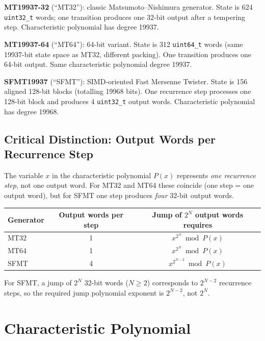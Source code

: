 \documentclass{article}
\begin{document}
\noindent\textbf{MT19937-32} (``MT32''): classic Matsumoto--Nishimura generator.  State is
624 \texttt{uint32\_t} words; one transition produces one 32-bit output after a tempering
step.  Characteristic polynomial has degree 19937.

\noindent\textbf{MT19937-64} (``MT64''): 64-bit variant.  State is 312 \texttt{uint64\_t}
words (same 19937-bit state space as MT32, different packing).  One transition produces
one 64-bit output.  Same characteristic polynomial degree 19937.

\noindent\textbf{SFMT19937} (``SFMT''): SIMD-oriented Fast Mersenne Twister.  State is 156
aligned 128-bit blocks (totalling 19968 bits).  One recurrence step processes one 128-bit
block and produces 4 \texttt{uint32\_t} output words.  Characteristic polynomial has degree
19968.

\subsection{Critical Distinction: Output Words per Recurrence Step}
\label{sec:output_per_step}

The variable $x$ in the characteristic polynomial $P(x)$ represents \emph{one recurrence
step}, not one output word.  For MT32 and MT64 these coincide (one step = one output word),
but for SFMT one step produces \emph{four} 32-bit output words.

\begin{center}
\begin{tabular}{lcc}
\toprule
Generator & Output words per step & Jump of $2^N$ output words requires \\
\midrule
MT32  & 1 & $x^{2^N} \bmod P(x)$ \\
MT64  & 1 & $x^{2^N} \bmod P(x)$ \\
SFMT  & 4 & $x^{2^{N-2}} \bmod P(x)$ \\
\bottomrule
\end{tabular}
\end{center}

For SFMT, a jump of $2^N$ 32-bit words ($N \geq 2$) corresponds to $2^{N-2}$ recurrence
steps, so the required jump polynomial exponent is $2^{N-2}$, not $2^N$.

\section{Characteristic Polynomial}
\label{sec:charpoly}
\end{document}
